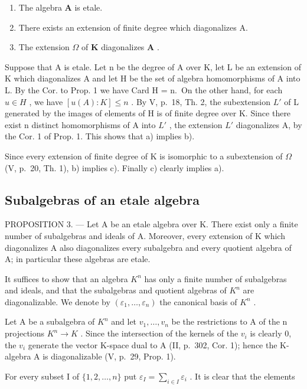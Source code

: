 \begin{enumerate}
\def\labelenumi{\alph{enumi})}
\item
  The algebra \(\mathbf{A}\) is etale.
\item
  There exists an extension of finite degree which diagonalizes A.
\item
  The extension \(\Omega\) of \(\mathbf{K}\) diagonalizes \(\mathbf{A}\) .
\end{enumerate}

Suppose that A is etale. Let n be the degree of A over K, let L be an extension of K which diagonalizes A and let H be the set of algebra homomorphisms of A into L. By the Cor. to Prop. 1 we have Card H = n.~On the other hand, for each \(u \in H\) , we have \([u(A):K] \leqslant n\) . By V, p.~18, Th. 2, the subextension \(L'\) of L generated by the images of elements of H is of finite degree over K. Since there exist n distinct homomorphisms of A into \(L'\) , the extension \(L'\) diagonalizes A, by the Cor. 1 of Prop. 1. This shows that a) implies b).

Since every extension of finite degree of K is isomorphic to a subextension of \(\Omega\) (V, p.~20, Th. 1), b) implies c). Finally c) clearly implies a).

\subsection{Subalgebras of an etale algebra}

PROPOSITION 3. --- Let A be an etale algebra over K. There exist only a finite number of subalgebras and ideals of A. Moreover, every extension of K which diagonalizes A also diagonalizes every subalgebra and every quotient algebra of A; in particular these algebras are etale.

It suffices to show that an algebra \(K^{n}\) has only a finite number of subalgebras and ideals, and that the subalgebras and quotient algebras of \(K^{n}\) are diagonalizable. We denote by \((\varepsilon_{1},\ldots,\varepsilon_{n})\) the canonical basis of \(K^{n}\) .

Let A be a subalgebra of \(K^{n}\) and let \(v_{1}, \ldots, v_{n}\) be the restrictions to A of the n projections \(K^{n} \rightarrow K\) . Since the intersection of the kernels of the \(v_{i}\) is clearly 0, the \(v_{i}\) generate the vector K-space dual to A (II, p.~302, Cor. 1); hence the K-algebra A is diagonalizable (V, p.~29, Prop. 1).

For every subset I of \(\{1, 2, \ldots, n\}\) put \(\varepsilon_{I} = \sum_{i \in I} \varepsilon_{i}\) . It is clear that the elements

